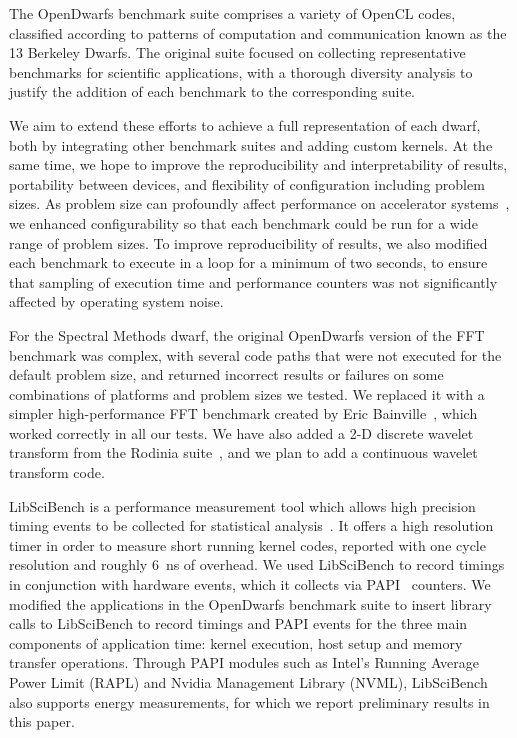 \documentclass[../document.tex]{subfiles}
\begin{document}
\label{sec:extending_the_opendwarfs_benchmark_suite}

The OpenDwarfs benchmark suite comprises a variety of OpenCL codes, classified according to patterns of computation and communication known as the 13 Berkeley Dwarfs.\cite{asanovic2006landscape}
The original suite focused on collecting representative benchmarks for scientific applications, with a thorough diversity analysis to justify the addition of each benchmark to the corresponding suite.

We aim to extend these efforts to achieve a full representation of each dwarf, both by integrating other benchmark suites and adding custom kernels.
At the same time, we hope to improve the reproducibility and interpretability of results, portability between devices, and flexibility of configuration including problem sizes.
As problem size can profoundly affect performance on accelerator systems~\cite{marjanovic2016hpc}, we enhanced configurability so that each benchmark could be run for a wide range of problem sizes.
To improve reproducibility of results, we also modified each benchmark to execute in a loop for a minimum of two seconds, to ensure that sampling of execution time and performance counters was not significantly affected by operating system noise.

For the Spectral Methods dwarf, the original OpenDwarfs version of the FFT benchmark was complex, with several code paths that were not executed for the default problem size, and returned incorrect results or failures on some combinations of platforms and problem sizes we tested.
We replaced it with a simpler high-performance FFT benchmark created by Eric Bainville~\cite{bainville2010fft}, which worked correctly in all our tests.
We have also added a 2-D discrete wavelet transform from the Rodinia suite~\cite{che2009rodinia}, and we plan to add a continuous wavelet transform code.

LibSciBench is a performance measurement tool which allows high precision timing events to be collected for statistical analysis~\cite{hoefler2015scientific}.
It offers a high resolution timer in order to measure short running kernel codes, reported with one cycle resolution and roughly \SI{6}{\nano\second} of overhead.
We used LibSciBench to record timings in conjunction with hardware events, which it collects via PAPI~\cite{mucci1999papi} counters.
We modified the applications in the OpenDwarfs benchmark suite to insert library calls to LibSciBench to record timings and PAPI events for the three main components of application time: kernel execution, host setup and memory transfer operations.
Through PAPI modules such as Intel's Running Average Power Limit (RAPL) and Nvidia Management Library (NVML), LibSciBench also supports energy measurements, for which we report preliminary results in this paper.
\end{document}
